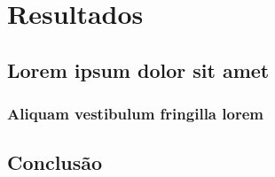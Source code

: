 \documentclass[
12pt,				%
openright,			%
twoside,			%
a4paper,			%
english,			%
french,				%
spanish,			%
brazil,				%
]{abntex2}
\begin{document}
	
	
	
	\part{Resultados}
	
	\chapter{Lorem ipsum dolor sit amet}
	
	\section{Aliquam vestibulum fringilla lorem}
	
	\lipsum[1]
	
	\lipsum[2-3]
	
	
	\chapter{Conclusão}
	
	\lipsum[31-33]
	
	\postextual
	
	
	
	
	
\end{document}
